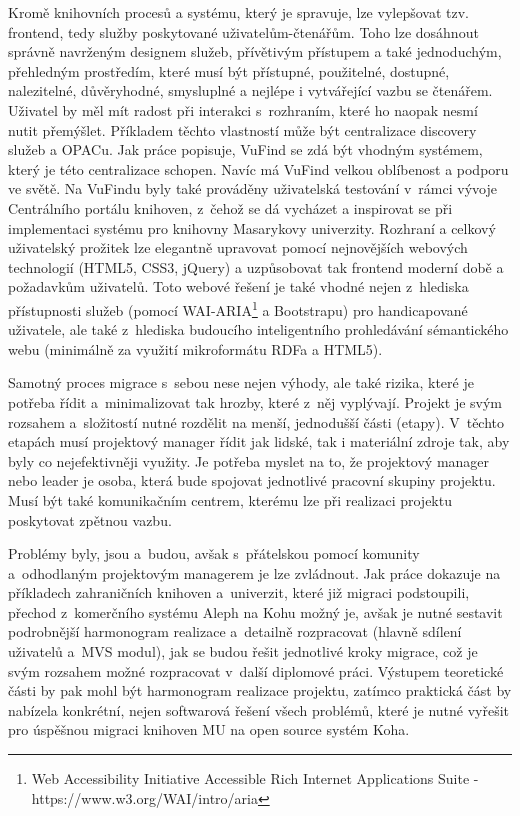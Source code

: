 \documentclass[
	11pt, oneside, printed, final, palatino, monochrome
	microtype,
	table,   %
	lof,     %
	lot     %
]{fithesis3}
\begin{document}
{Kromě knihovních procesů a systému, který je spravuje, lze vylepšovat tzv. frontend, tedy služby poskytované uživatelům-čtenářům. Toho lze dosáhnout správně navrženým designem služeb, přívětivým přístupem a také jednoduchým, přehledným prostředím, které musí být přístupné, použitelné, dostupné, nalezitelné, důvěryhodné, smysluplné a nejlépe i vytvářející vazbu se čtenářem. Uživatel by měl mít radost při interakci s~rozhraním, které ho naopak nesmí nutit přemýšlet. Příkladem těchto vlastností může být centralizace discovery služeb a OPACu. Jak práce popisuje, VuFind se zdá být vhodným systémem, který je této centralizace schopen. Navíc má VuFind velkou oblíbenost a podporu ve světě. Na VuFindu byly také prováděny uživatelská testování v~rámci vývoje Centrálního portálu knihoven, z~čehož se dá vycházet a inspirovat se při implementaci systému pro knihovny Masarykovy univerzity. Rozhraní a celkový uživatelský prožitek lze elegantně upravovat pomocí nejnovějších webových technologií (HTML5, CSS3, jQuery) a uzpůsobovat tak frontend moderní době a požadavkům uživatelů. Toto webové řešení je také vhodné nejen z~hlediska  přístupnosti služeb (pomocí WAI-ARIA\footnote{Web Accessibility Initiative Accessible Rich Internet Applications Suite -  https://www.w3.org/WAI/intro/aria
} a Bootstrapu) pro handicapované uživatele, ale také z~hlediska budoucího inteligentního prohledávání sémantického webu (minimálně za využití mikroformátu RDFa a HTML5).  
 
 Samotný proces migrace s~sebou nese nejen výhody, ale také rizika, které je potřeba řídit a~minimalizovat tak hrozby, které z~něj vyplývají. Projekt je svým rozsahem a~složitostí nutné rozdělit na menší, jednodušší části (etapy). V~těchto etapách musí projektový manager řídit jak lidské, tak i materiální zdroje tak, aby byly co nejefektivněji využity. Je potřeba myslet na to, že projektový manager nebo leader je osoba, která bude spojovat jednotlivé pracovní skupiny projektu. Musí být také komunikačním centrem, kterému lze při realizaci projektu poskytovat zpětnou vazbu. 
 
  Problémy byly, jsou a~budou, avšak s~přátelskou pomocí komunity a~odhodlaným projektovým managerem je lze zvládnout. Jak práce dokazuje na příkladech zahraničních knihoven a~univerzit, které již migraci podstoupili, přechod z~komerčního systému Aleph na Kohu možný je, avšak je nutné sestavit podrobnější harmonogram realizace a~detailně rozpracovat (hlavně sdílení uživatelů a~MVS modul), jak se budou řešit jednotlivé kroky migrace, což je svým rozsahem možné rozpracovat v~další diplomové práci. Výstupem teoretické části by pak mohl být harmonogram realizace projektu, zatímco praktická část by nabízela konkrétní, nejen softwarová řešení všech problémů, které je nutné vyřešit pro úspěšnou migraci knihoven MU na open source systém Koha.

}
\end{document}
